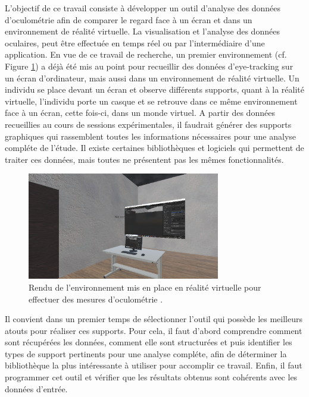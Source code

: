 \documentclass[hidelinks,12pt]{article}
\begin{document}
\bigskip
L'objectif de ce travail consiste à développer un outil d'analyse des données
d'oculométrie afin de comparer le regard face à un écran et dans un
environnement de réalité virtuelle. La visualisation et l'analyse des données
oculaires, peut être effectuée en temps réel ou par l'intermédiaire d'une
application. En vue de ce travail de recherche, un premier environnement (cf.
Figure \ref{fig:environnement}) a déjà été mis au point pour recueillir des
données d'eye-tracking sur un écran d'ordinateur, mais aussi dans un
environnement de réalité virtuelle. Un individu se place devant un écran et
observe différents supports, quant à la réalité virtuelle, l'individu porte un
casque et se retrouve dans ce même environnement face à un écran, cette fois-ci,
dans un monde virtuel. A partir des données recueillies au cours de sessions
expérimentales, il faudrait générer des supports graphiques qui rassemblent
toutes les informations nécessaires pour une analyse compléte de l'étude. Il
existe certaines bibliothèques et logiciels qui permettent de traiter ces
données, mais toutes ne présentent pas les mêmes fonctionnalités.

\begin{figure}[htpb]
  \centering
  \includegraphics[width=0.75\textwidth,keepaspectratio=true]{environnement.png}
  \caption{Rendu de l'environnement mis en place en réalité virtuelle pour
    effectuer des mesures d'oculométrie \cite{img_environnement}.}
  \label{fig:environnement}
\end{figure}

\bigskip
Il convient dans un premier temps de sélectionner l'outil qui possède les
meilleurs atouts pour réaliser ces supports. Pour cela, il faut d'abord
comprendre comment sont récupérées les données, comment elle sont structurées
et puis identifier les types de support pertinents pour une analyse compléte,
afin de déterminer la bibliothèque la plus intéressante à utiliser pour
accomplir ce travail. Enfin, il faut programmer cet outil et vérifier que les
résultats obtenus sont cohérents avec les données d'entrée.
\end{document}
